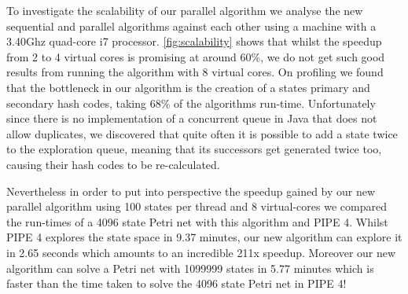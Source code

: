 % 
% 


To investigate the scalability of our parallel algorithm we analyse the new sequential and parallel algorithms against each other using a machine with a 3.40Ghz quad-core i7 processor. \cref{fig:scalability} shows that whilst the speedup from 2 to 4 virtual cores is promising at around 60\%, we do not get such good results from running the algorithm with 8 virtual cores. On profiling we found that the bottleneck in our algorithm is the creation of a states primary and secondary hash codes, taking 68\% of the algorithms run-time. Unfortunately since there is no implementation of a concurrent queue in Java that does not allow duplicates, we discovered that quite often it is possible to add a state twice to the exploration queue, meaning that its successors get generated twice too, causing their hash codes to be re-calculated.



Nevertheless in order to put into perspective the speedup gained by our new parallel algorithm using 100 states per thread and 8 virtual-cores we compared the run-times of a 4096 state Petri net with this algorithm and PIPE 4. Whilst PIPE 4 explores the state space in 9.37 minutes, our new algorithm can explore it in 2.65 seconds which amounts to an incredible 211x speedup. Moreover our new algorithm can solve a Petri net with \num{1099999} states in 5.77 minutes which is faster than the time taken to solve the 4096 state Petri net in PIPE 4!